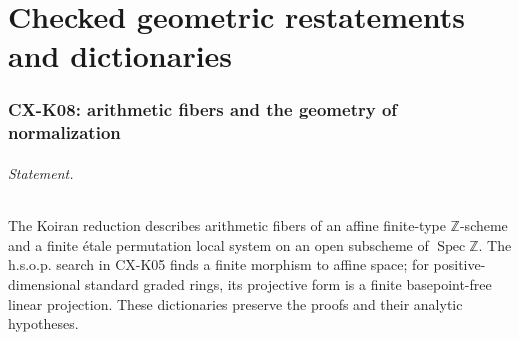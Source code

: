 \documentclass[11pt,a4paper]{article}
\begin{document}
\clearpage\part{Checked geometric restatements and dictionaries}


\section{CX-K08: arithmetic fibers and the geometry of normalization}
\label{cx:k08}

\paragraph{Statement.}
The Koiran reduction describes arithmetic fibers of an affine
finite-type $\mathbb Z$-scheme and a finite \'etale permutation local
system on an open subscheme of $\operatorname{Spec}\mathbb Z$.
The h.s.o.p. search in CX-K05 finds a finite morphism to affine space;
for positive-dimensional standard graded rings, its projective form
is a finite basepoint-free linear projection. These dictionaries
preserve the proofs and their analytic hypotheses.
\end{document}
